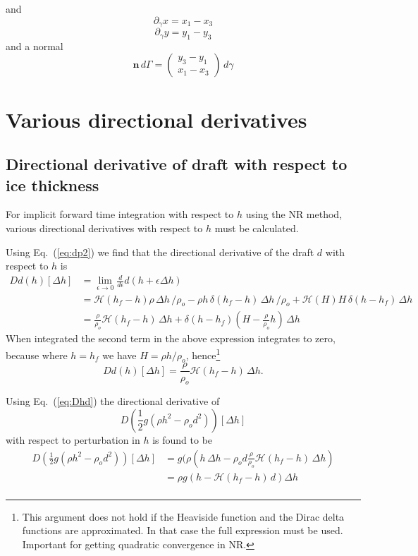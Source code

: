 \documentclass[10pt,a4paper]{book}
\newcommand{\He}{\mathcal{H}}
\newcommand{\p}{\partial}
\begin{document}
and 
\[\p_{\gamma} x= x_1 -x_3 \]
\[\p_{\gamma} y= y_1 - y_3 \]
and a normal
\[
\bm{n} \, d \Gamma= \left ( \begin{array}{c} y_3 -y_1 \\ x_1 - x_3 \end{array} \right ) \,d \gamma
\]


\section{Various directional derivatives}


\subsection{Directional derivative of draft with respect to ice thickness}

For implicit forward time integration with respect to $h$ using the NR method, various directional derivatives with
respect to $h$ must be calculated.

Using Eq.~(\ref{eq:dp2}) we find that the directional derivative of the draft $d$ with respect to $h$ is
\begin{align*}
D d(h)[\Delta h]
&=\lim_{\epsilon \to 0} \frac{d}{d\epsilon} d(h+\epsilon \Delta h)\\
&=\He(h_f-h) \rho \, \Delta h\, /\rho_o - \rho h \, \delta(h_f-h) \, \Delta h\, /\rho_o+ \He(H) H \, \delta(h-h_f) \, \Delta h \\
&=\frac{\rho}{\rho_o} \He(h_f-h) \, \Delta h + \delta(h-h_f) ( H-\frac{\rho}{\rho_o} h) \, \Delta h
\end{align*}
When integrated the second term in the above expression integrates to zero, because where $h=h_f$ we have $H =\rho
h/\rho_o$, hence\footnote{This argument does not hold if the Heaviside function and the Dirac delta functions are
  approximated. In that case the full expression must be used. Important for getting quadratic convergence in NR.}
\begin{equation}
D d(h)[\Delta h]=\frac{\rho}{\rho_o} \He(h_f-h) \, \Delta h .
\label{eq:Dhd}
\end{equation}

Using Eq.~(\ref{eq:Dhd}) the directional derivative of
\[
D(\frac{1}{2} g (\rho h^2 - \rho_o d^2))[\Delta h]
\]
with respect to perturbation in $h$ is found to be
\begin{align*}
D\left (\frac{1}{2} g (\rho h^2 - \rho_o d^2) \right )[\Delta h]
&= g (\rho (h \, \Delta h - \rho_o d \frac{\rho}{\rho_o} \He(h_f-h) \, \Delta h)\\
&= \rho g \left ( h - \He(h_f-h) \, d \right ) \Delta h \\
\end{align*}
\end{document}
